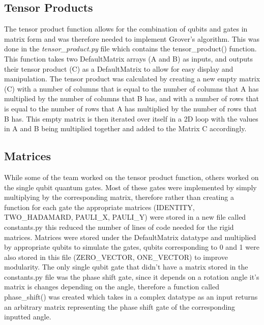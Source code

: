 \documentclass{article}
\begin{document}
\subsection{Tensor Products}
The tensor product function allows for the combination of qubits and gates in matrix form and was therefore needed to implement Grover's algorithm. This was done in the \textit{tensor\_product.py} file which contains the tensor\_product() function. This function takes two DefaultMatrix arrays (A and B) as inputs, and outputs their tensor product (C) as a DefaultMatrix to allow for easy display and manipulation. The tensor product was calculated by creating a new empty matrix (C) with a number of columns that is equal to the number of columns that A has multiplied by the number of columns that B has, and with a number of rows that is equal to the number of rows that A has multiplied by the number of rows that B has. This empty matrix is then iterated over itself in a 2D loop with the values in A and B being multiplied together and added to the Matrix C accordingly.

\subsection{Matrices}
While some of the team worked on the tensor product function, others worked on the single qubit quantum gates. Most of these gates were implemented by simply multiplying by the corresponding matrix, therefore rather than creating a function for each gate the appropriate matrices (IDENTITY, TWO\_HADAMARD, PAULI\_X, PAULI\_Y) were stored in a new file called constants.py this reduced the number of lines of code needed for the rigid matrices. Matrices were stored under the DefaultMatrix datatype and multiplied by appropriate qubits to simulate the gates, qubits corresponding to 0 and 1 were also stored in this file (ZERO\_VECTOR, ONE\_VECTOR) to improve modularity. The only single qubit gate that didn’t have a matrix stored in the constants.py file was the phase shift gate, since it depends on a rotation angle it’s matrix is changes depending on the angle, therefore a function called phase\_shift() was created which takes in a complex datatype as an input returns an arbitrary matrix representing the phase shift gate of the corresponding inputted angle.
\end{document}
